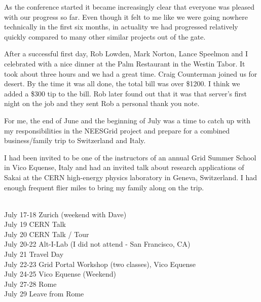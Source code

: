 \documentclass[12pt]{book}
\begin{document}
As the conference started it became increasingly clear
that everyone was pleased with our progress so far.   Even
though it felt to me like we were going nowhere technically
in the first six months, in actuality
we had progressed relatively quickly compared to many
other similar projects out of the gate.


After a successful first day, Rob Lowden, Mark
Norton, Lance Speelmon and I celebrated with a
nice dinner at the Palm Restaurant in the Westin Tabor.
It took about three hours and we had a great time.
Craig Counterman joined us for desert.  By the time
it was all done, the total bill was over \$1200.  I think we
added a \$300 tip to the bill. Rob later found out that it was that
server's first night on the job and they sent Rob a personal
thank you note.




For me, the end of June and the beginning of July was
a time to catch up with my responsibilities in
the NEESGrid project and prepare for a combined business\slash family
trip to Switzerland and Italy.

I had been invited to be one of the instructors of
an annual Grid Summer School in Vico Equense, Italy
and had an invited talk about research applications
of Sakai at the CERN high-energy physics laboratory
in Geneva, Switzerland.  I had enough frequent
flier miles to bring my family along on the trip.\\
\\
\begin{sf}
July 17-18 Zurich (weekend with Dave)\\
July 19 CERN Talk\\
July 20 CERN Talk / Tour\\
July 20-22 Alt-I-Lab (I did not attend - San Francisco, CA)\\
July 21 Travel Day\\
July 22-23 Grid Portal Workshop (two classes), Vico Equense\\
July 24-25 Vico Equense (Weekend)\\
July 27-28 Rome\\
July 29 Leave from Rome\\
\end{sf}
\end{document}
